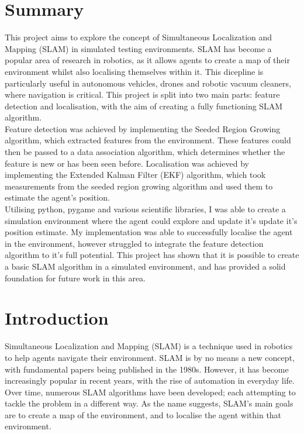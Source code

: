 \documentclass[12pt]{article}
\begin{document}
\newpage

\section*{Summary}
This project aims to explore the concept of Simultaneous Localization and Mapping (SLAM) in simulated testing environments.
SLAM has become a popular area of research in robotics, as it allows agents to create a map of their environment whilst also
localising themselves within it. This dicepline is particularly useful in autonomous vehicles, drones and robotic vacuum cleaners,
where navigation is critical. This project is split into two main parts: feature detection and localisation, with the aim of creating
a fully functioning SLAM algorithm.\\
Feature detection was achieved by implementing the Seeded Region Growing algorithm, which extracted features from the environment.
These features could then be passed to a data association algorithm, which determines whether the feature is new or has been seen before.
Localisation was achieved by implementing the Extended Kalman Filter (EKF) algorithm, which took measurements from the seeded region
growing algorithm and used them to estimate the agent's position.\\
Utilising python, pygame and various scientific libraries, I was able to create a simulation environment where the agent could explore and
update it's update it's position estimate. My implementation was able to successfully localise the agent in the environment, however
struggled to integrate the feature detection algorithm to it's full potential. This project has shown that it is possible to create a basic SLAM
algorithm in a simulated environment, and has provided a solid foundation for future work in this area.

\newpage
\tableofcontents
\newpage

\section{Introduction}
Simultaneous Localization and Mapping (SLAM) is a technique used in robotics to help agents navigate their environment. SLAM is
by no means a new concept, with fundamental papers being published in the 1980s. However, it has become increasingly popular
in recent years, with the rise of automation in everyday life. Over time, numerous SLAM algorithms have been developed; each
attempting to tackle the problem in a different way. As the name suggests, SLAM's main goals are to create a map of the environment,
and to localise the agent within that environment.\\
\end{document}
